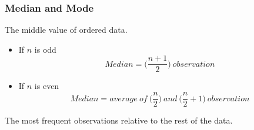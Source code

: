 \documentclass[xcolor=svgnames, compress]{beamer}
\begin{document}
\begin{frame}
\frametitle{Median and Mode} 

\vspace{-0.3cm}

\begin{definition}[Median]
The middle value of ordered data.
\end{definition}

\vspace{-0.2cm}

\begin{itemize}
\item	If $n$ is \alert{odd}
	\begin{equation*}
	Median = \bigg( \frac{n + 1}{2} \bigg) ~observation
	\end{equation*} 
\item	If $n$ is \alert{even}
	\begin{equation*}
	Median = average~ of ~\bigg(\frac{n}{2} \bigg) ~and~ \bigg( \frac{n}{2} + 1\bigg) ~observation
	\end{equation*} 
\end{itemize}

\vspace{-0.35cm}

\begin{definition}[Mode]
The most frequent observations relative to the rest of the data.
\end{definition}
%
\end{frame}
%


\end{document}
